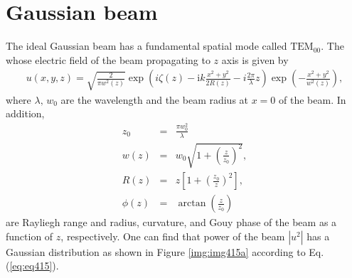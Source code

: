 \section{Gaussian beam}
The ideal Gaussian beam has a fundamental spatial mode called $\mathrm{TEM}_{00}$. The whose electric field of the beam propagating to $z$ axis is given by \cite{bond2016interferometer,svelto1998principles}
\begin{eqnarray}
  u(x, y, z)=\sqrt{\frac{2}{\pi{w^2(z)}}} \exp \left(i\zeta(z)-\mathrm{i} k \frac{x^{2} +y^{2}}{2 R(z)}-i\frac{2\pi}{\lambda}z\right)
  \exp \left(-\frac{x^{2}+y^{2}}{w^{2}(z)}\right),  \label{eq:eq415}
\end{eqnarray}
where $\lambda,\,w_0$ are the wavelength and the beam radius at $x=0$ of the beam. In addition,
\begin{eqnarray}
  z_0 &=& \frac{\pi{w^2_0}}{\lambda} \\ \label{eq:eq415_a}
  w(z) &=& w_0\sqrt{1+\left(\frac{z}{z_0}\right)^2}, \\ \label{eq:eq415_b}
  R(z) &=& z\left[1+\left(\frac{z_0}{z}\right)^2\right],\\ \label{eq:eq415_c}
  \phi(z) &=& \arctan\left(\frac{z}{z_0}\right) \label{eq:eq415_d}
\end{eqnarray}
are Rayliegh range and radius, curvature, and Gouy phase of the beam as a function of $z$, respectively. One can find that power of the beam $|u^2|$ has a Gaussian distribution as shown in Figure  \ref{img:img415a} according to Eq.(\ref{eq:eq415}). 

